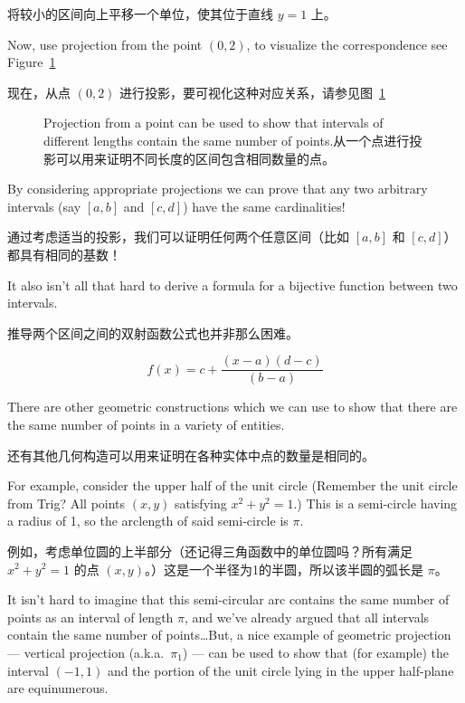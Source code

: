 将较小的区间向上平移一个单位，使其位于直线 $y = 1$ 上。

Now, use projection
from the point $(0, 2)$, to visualize the correspondence
see Figure~\ref{fig:equiv_intervals}

现在，从点 $(0, 2)$ 进行投影，要可视化这种对应关系，请参见图~\ref{fig:equiv_intervals}

\begin{figure}[!hbtp]
    
    \caption[Equivalent intervals.等价区间。]{Projection from a point can be %
        used to show that intervals of %
        different lengths contain the same number of points.从一个点进行投影可以用来证明不同长度的区间包含相同数量的点。}
    \label{fig:equiv_intervals}
\end{figure}

By considering appropriate projections we can prove that any two arbitrary
intervals (say $[a, b]$ and $[c, d]$) have the same cardinalities!

通过考虑适当的投影，我们可以证明任何两个任意区间（比如 $[a, b]$ 和 $[c, d]$）都具有相同的基数！

It also
isn't all that hard to derive a formula for a bijective function between two
intervals.

推导两个区间之间的双射函数公式也并非那么困难。

\[ f(x) = c + \frac{(x - a)(d - c)}{(b - a)} \]

There are other geometric constructions which we can use to show that
there are the same number of points in a variety of entities.

还有其他几何构造可以用来证明在各种实体中点的数量是相同的。

For example,
consider the upper half of the unit circle (Remember the unit circle from
Trig?  All points $(x, y)$ satisfying $x^2 + y^2 = 1$.)  This is a
semi-circle having a radius of 1, so the arclength of said semi-circle
is $\pi$.

例如，考虑单位圆的上半部分（还记得三角函数中的单位圆吗？所有满足 $x^2 + y^2 = 1$ 的点 $(x, y)$。）这是一个半径为1的半圆，所以该半圆的弧长是 $\pi$。

It isn't hard to imagine
that this semi-circular arc contains the same number of points as an interval
of length $\pi$, and we've already argued that all intervals contain the same
number of points\ldots   But, a nice example of geometric projection ---
vertical projection (a.k.a.\ $\pi_1$) ---  can be used to show that
(for example) the interval
$(-1, 1)$ and the portion of the unit circle lying in the upper
half-plane are equinumerous.

